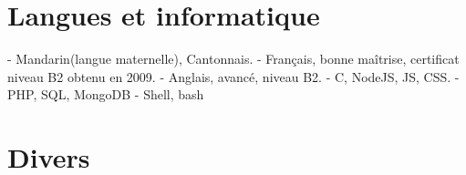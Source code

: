 \documentclass[11pt,a4paper]{moderncv}
\begin{document}
\section{Langues et informatique}
{
- Mandarin(langue maternelle), Cantonnais.\newline
- Français, bonne maîtrise, certificat niveau B2 obtenu en 2009.\newline
- Anglais, avancé, niveau B2.
}
{
- C, NodeJS, JS, CSS.\newline
- PHP, SQL, MongoDB
- Shell, bash
}

\section{Divers}
\end{document}
